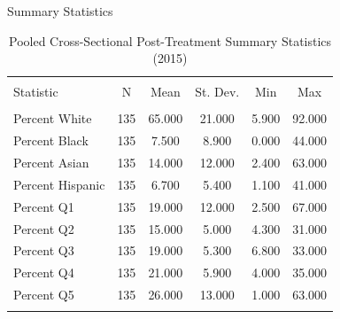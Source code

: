 \documentclass[11pt,ignorenonframetext,]{beamer}
\begin{document}
\begin{frame}{Summary Statistics}
\protect\hypertarget{summary-statistics-1}{}

\begin{table}[!htbp] \centering 
  \caption{Pooled Cross-Sectional Post-Treatment Summary Statistics (2015)} 
  \label{} 
\begin{tabular}{@{\extracolsep{5pt}}lccccc} 
\\[-1.8ex]\hline \\[-1.8ex] 
Statistic & \multicolumn{1}{c}{N} & \multicolumn{1}{c}{Mean} & \multicolumn{1}{c}{St. Dev.} & \multicolumn{1}{c}{Min} & \multicolumn{1}{c}{Max} \\ 
\hline \\[-1.8ex] 
Percent White & 135 & 65.000 & 21.000 & 5.900 & 92.000 \\ 
Percent Black & 135 & 7.500 & 8.900 & 0.000 & 44.000 \\ 
Percent Asian & 135 & 14.000 & 12.000 & 2.400 & 63.000 \\ 
Percent Hispanic & 135 & 6.700 & 5.400 & 1.100 & 41.000 \\ 
Percent Q1 & 135 & 19.000 & 12.000 & 2.500 & 67.000 \\ 
Percent Q2 & 135 & 15.000 & 5.000 & 4.300 & 31.000 \\ 
Percent Q3 & 135 & 19.000 & 5.300 & 6.800 & 33.000 \\ 
Percent Q4 & 135 & 21.000 & 5.900 & 4.000 & 35.000 \\ 
Percent Q5 & 135 & 26.000 & 13.000 & 1.000 & 63.000 \\ 
\hline \\[-1.8ex] 
\end{tabular} 
\end{table}

\end{frame}
\end{document}
